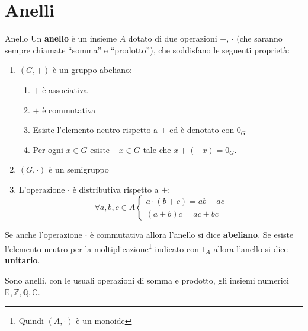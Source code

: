 \section{Anelli}

\begin{defbox}{Anello}
	Un \textbf{anello} è un insieme $A$ dotato di due operazioni $+$, $\cdot$ (che saranno sempre chiamate ``somma'' e ``prodotto''), che soddisfano le seguenti proprietà:
	\begin{enumerate}
		\item $(G,+)$ è un gruppo abeliano:
		\begin{enumerate}
			\item $+$ è associativa
			\item $+$ è commutativa
			\item Esiste l'elemento neutro rispetto a $+$ ed è denotato con $0_{G}$
			\item Per ogni $x \in G$ esiste $-x \in G$ tale che $x+(-x)=0_{G}$.
		\end{enumerate}
		\item $(G,\cdot)$ è un semigruppo
		\item L'operazione $\cdot$ è distributiva rispetto a $+$:
		\begin{displaymath}
			\forall a,b,c \in A \begin{cases}
				a \cdot (b+c) = ab + ac \\
				(a+b)c = ac + bc
			\end{cases}
		\end{displaymath}
	\end{enumerate}
	Se anche l'operazione $\cdot$ è commutativa allora l'anello si dice \textbf{abeliano}. Se esiste l'elemento neutro per la moltiplicazione\footnote{Quindi $(A,\cdot)$ è un monoide} indicato con $1_{A}$ allora l'anello si dice \textbf{unitario}.
\end{defbox}
\begin{example}
	Sono anelli, con le usuali operazioni di somma e prodotto, gli insiemi numerici $\mathbb{R}, \mathbb{Z}, \mathbb{Q}, \mathbb{C}$.
\end{example}
